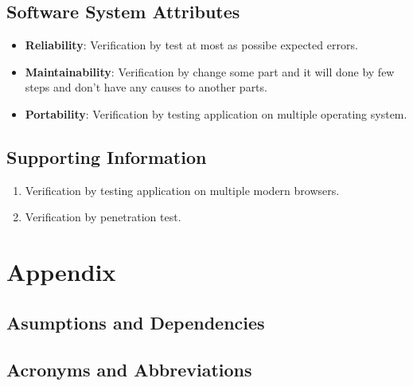 \documentclass[ 10pt]{report}
\begin{document}
        \section{Software System Attributes}
        \begin{itemize}
            \item \textbf{Reliability}: Verification by test at most as possibe expected errors.
            \item \textbf{Maintainability}: Verification by change some part and it will done by few steps and don't have any causes to another parts.
            \item \textbf{Portability}: Verification by testing application on multiple operating system.
        \end{itemize}
        \section{Supporting Information}
        \begin{enumerate}
            \item Verification by testing application on multiple modern browsers.
            \item Verification by penetration test.
        \end{enumerate}
    \pagebreak


    \chapter{Appendix}
        \section{Asumptions and Dependencies}
        \section{Acronyms and Abbreviations}


\end{document}
